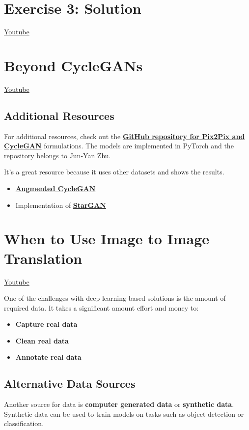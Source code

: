 \section{Exercise 3: Solution}
\href{https://www.youtube.com/watch?v=d1iaODMAk0I}{Youtube}

\section{Beyond CycleGANs}
\href{https://www.youtube.com/watch?v=Kuz7cdnRUh4}{Youtube}
\subsection{Additional Resources}
For additional resources, check out the \href{https://github.com/junyanz/pytorch-CycleGAN-and-pix2pix}{\textbf{GitHub repository for Pix2Pix and CycleGAN}} formulations. The models are implemented in PyTorch and the repository belongs to Jun-Yan Zhu. \newline

It's a great resource because it uses other datasets and shows the results.

\begin{itemize}
    \item \href{https://arxiv.org/abs/1802.10151}{\textbf{Augmented CycleGAN}}
    \item Implementation of \href{https://github.com/yunjey/StarGAN}{\textbf{StarGAN}}
\end{itemize}

\section{When to Use Image to Image Translation}
\href{https://www.youtube.com/watch?v=YmDHVoTmXIs}{Youtube} \newline

One of the challenges with deep learning based solutions is the amount of required data. It takes a significant amount effort and money to:

\begin{itemize}
    \item \textbf{Capture real data}
    \item \textbf{Clean real data}
    \item \textbf{Annotate real data}
\end{itemize}

\subsection{Alternative Data Sources}
Another source for data is \textbf{computer generated data} or \textbf{synthetic data}. Synthetic data can be used to train models on tasks such as object detection or classification. \newline

